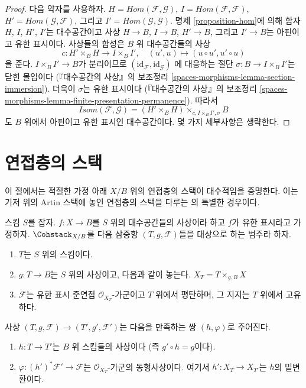 \begin{proof}
다음 약자를 사용하자.
$H = \mathit{Hom}(\mathcal{F}, \mathcal{G})$,
$I = \mathit{Hom}(\mathcal{F}, \mathcal{F})$,
$H' = \mathit{Hom}(\mathcal{G}, \mathcal{F})$, 그리고
$I' = \mathit{Hom}(\mathcal{G}, \mathcal{G})$.
명제 \ref{proposition-hom}에 의해 함자
$H$, $I$, $H'$, $I'$는 대수공간이고 사상
$H \to B$, $I \to B$, $H' \to B$, 그리고 $I' \to B$는
아핀이고 유한 표시이다. 사상들의 합성은 $B$ 위 대수공간들의 사상
$$
c : H' \times_B H \longrightarrow I \times_B I',\quad
(u', u) \longmapsto (u \circ u', u' \circ u)
$$
을 준다.
$I \times_B I' \to B$가 분리이므로
$(\text{id}_\mathcal{F}, \text{id}_\mathcal{G})$
에 대응하는 절단 $\sigma : B \to I \times_B I'$는 닫힌 몰입이다
(『대수공간의 사상』의 보조정리
\ref{spaces-morphisms-lemma-section-immersion}).
더욱이 $\sigma$는 유한 표시이다
(『대수공간의 사상』의 보조정리
\ref{spaces-morphisms-lemma-finite-presentation-permanence}).
따라서
$$
\mathit{Isom}(\mathcal{F}, \mathcal{G}) =
(H' \times_B H) \times_{c, I \times_B I', \sigma} B
$$
도 $B$ 위에서 아핀이고 유한 표시인 대수공간이다.
몇 가지 세부사항은 생략한다.
\end{proof}






\section{연접층의 스택}
\label{section-stack-coherent-sheaves}

\noindent
이 절에서는 적절한 가정 아래 $X/B$ 위의 연접층의 스택이
대수적임을 증명한다. 이는 기저 위의 Artin 스택에 놓인
연접층의 스택을 다루는 \cite[Theorem 2.1.1]{lieblich_remarks}의
특별한 경우이다.

\begin{situation}
\label{situation-coherent}
스킴 $S$를 잡자. $f : X \to B$를 $S$ 위의 대수공간들의
사상이라 하고 $f$가 유한 표시라고 가정하자.
$\Cohstack_{X/B}$를 다음 삼중항 $(T, g, \mathcal{F})$들을
대상으로 하는 범주라 하자.
\begin{enumerate}
\item $T$는 $S$ 위의 스킴이다.
\item $g : T \to B$는 $S$ 위의 사상이고, 다음과 같이 놓는다.
$X_T = T \times_{g, B} X$
\item $\mathcal{F}$는 유한 표시 준연접 $\mathcal{O}_{X_T}$-가군이고
$T$ 위에서 평탄하며, 그 지지는 $T$ 위에서 고유하다.
\end{enumerate}
사상 $(T, g, \mathcal{F}) \to (T', g', \mathcal{F}')$는 다음을
만족하는 쌍 $(h, \varphi)$로 주어진다.
\begin{enumerate}
\item $h : T \to T'$는 $B$ 위 스킴들의 사상이다
(즉 $g' \circ h = g$이다).
\item $\varphi : (h')^*\mathcal{F}' \to \mathcal{F}$는
$\mathcal{O}_{X_T}$-가군의 동형사상이다. 여기서
$h' : X_T \to X_{T'}$는 $h$의 밑변환이다.
\end{enumerate}
\end{situation}

